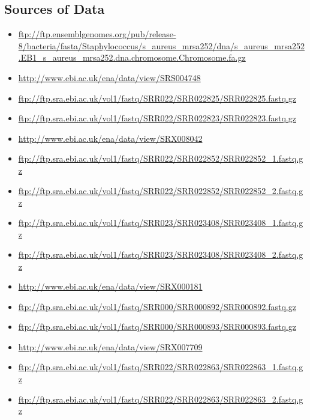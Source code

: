 \subsection{Sources of Data}
\begin{itemize}
\item \url{ftp://ftp.ensemblgenomes.org/pub/release-8/bacteria/fasta/Staphylococcus/s_aureus_mrsa252/dna/s_aureus_mrsa252.EB1_s_aureus_mrsa252.dna.chromosome.Chromosome.fa.gz}
\item \url{http://www.ebi.ac.uk/ena/data/view/SRS004748}
\item \url{ftp://ftp.sra.ebi.ac.uk/vol1/fastq/SRR022/SRR022825/SRR022825.fastq.gz}
\item \url{ftp://ftp.sra.ebi.ac.uk/vol1/fastq/SRR022/SRR022823/SRR022823.fastq.gz}
\item \url{http://www.ebi.ac.uk/ena/data/view/SRX008042}
\item \url{ftp://ftp.sra.ebi.ac.uk/vol1/fastq/SRR022/SRR022852/SRR022852_1.fastq.gz}
\item \url{ftp://ftp.sra.ebi.ac.uk/vol1/fastq/SRR022/SRR022852/SRR022852_2.fastq.gz}
\item \url{ftp://ftp.sra.ebi.ac.uk/vol1/fastq/SRR023/SRR023408/SRR023408_1.fastq.gz}
\item \url{ftp://ftp.sra.ebi.ac.uk/vol1/fastq/SRR023/SRR023408/SRR023408_2.fastq.gz}
\item \url{http://www.ebi.ac.uk/ena/data/view/SRX000181}
\item \url{ftp://ftp.sra.ebi.ac.uk/vol1/fastq/SRR000/SRR000892/SRR000892.fastq.gz}
\item \url{ftp://ftp.sra.ebi.ac.uk/vol1/fastq/SRR000/SRR000893/SRR000893.fastq.gz}
\item \url{http://www.ebi.ac.uk/ena/data/view/SRX007709}
\item \url{ftp://ftp.sra.ebi.ac.uk/vol1/fastq/SRR022/SRR022863/SRR022863_1.fastq.gz}
\item \url{ftp://ftp.sra.ebi.ac.uk/vol1/fastq/SRR022/SRR022863/SRR022863_2.fastq.gz}
\end{itemize}

